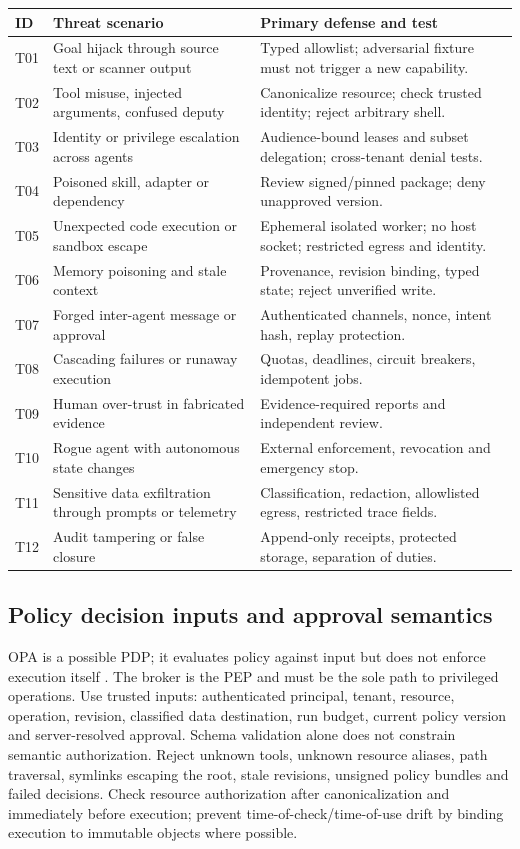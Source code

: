 \documentclass[11pt,letterpaper]{article}
\begin{document}
\begin{longtable}{@{}>{\raggedright\arraybackslash}p{.16\linewidth}>{\raggedright\arraybackslash}p{.37\linewidth}>{\raggedright\arraybackslash}p{.39\linewidth}@{}}
\toprule ID & Threat scenario & Primary defense and test\\\midrule\endhead
T01 & Goal hijack through source text or scanner output & Typed allowlist; adversarial fixture must not trigger a new capability.\\
T02 & Tool misuse, injected arguments, confused deputy & Canonicalize resource; check trusted identity; reject arbitrary shell.\\
T03 & Identity or privilege escalation across agents & Audience-bound leases and subset delegation; cross-tenant denial tests.\\
T04 & Poisoned skill, adapter or dependency & Review signed/pinned package; deny unapproved version.\\
T05 & Unexpected code execution or sandbox escape & Ephemeral isolated worker; no host socket; restricted egress and identity.\\
T06 & Memory poisoning and stale context & Provenance, revision binding, typed state; reject unverified write.\\
T07 & Forged inter-agent message or approval & Authenticated channels, nonce, intent hash, replay protection.\\
T08 & Cascading failures or runaway execution & Quotas, deadlines, circuit breakers, idempotent jobs.\\
T09 & Human over-trust in fabricated evidence & Evidence-required reports and independent review.\\
T10 & Rogue agent with autonomous state changes & External enforcement, revocation and emergency stop.\\
T11 & Sensitive data exfiltration through prompts or telemetry & Classification, redaction, allowlisted egress, restricted trace fields.\\
T12 & Audit tampering or false closure & Append-only receipts, protected storage, separation of duties.\\
\bottomrule
\end{longtable}

\subsection{Policy decision inputs and approval semantics}
OPA is a possible PDP; it evaluates policy against input but does not enforce execution itself \cite{opa}. The broker is the PEP and must be the sole path to privileged operations. Use trusted inputs: authenticated principal, tenant, resource, operation, revision, classified data destination, run budget, current policy version and server-resolved approval. Schema validation alone does not constrain semantic authorization. Reject unknown tools, unknown resource aliases, path traversal, symlinks escaping the root, stale revisions, unsigned policy bundles and failed decisions. Check resource authorization after canonicalization and immediately before execution; prevent time-of-check/time-of-use drift by binding execution to immutable objects where possible.
\end{document}
